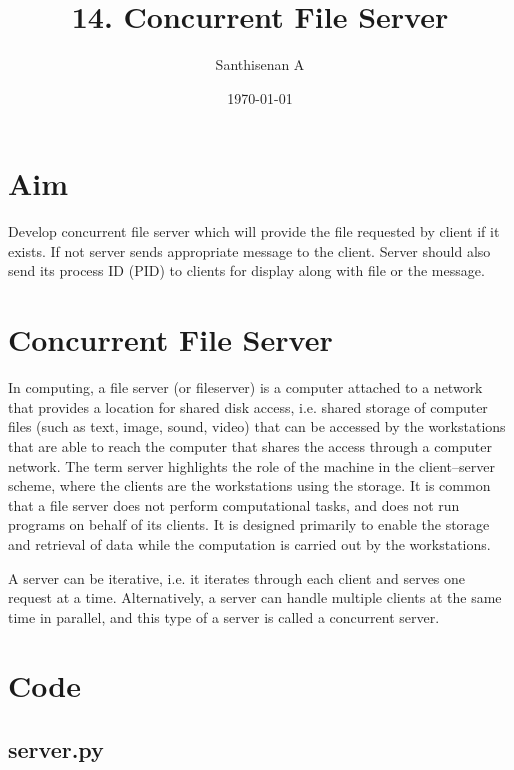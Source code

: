 \documentclass[a4paper,12pt]{article}
\begin{document}
    \title{14. Concurrent File Server}
    \author{Santhisenan A}
    \date{\today}
    \maketitle

\section{Aim}
Develop concurrent file server which will provide the file requested by client if it exists. If not server
sends appropriate message to the client. Server should also send its process ID (PID) to clients for
display along with file or the message.

\section {Concurrent File Server}
In computing, a file server (or fileserver) is a computer attached to a network that provides a location for shared disk access, 
i.e. shared storage of computer files (such as text, image, sound, video) that can be accessed by the workstations 
that are able to reach the computer that shares the access through a computer network. The term server highlights 
the role of the machine in the client–server scheme, where the clients are the workstations using the storage. 
It is common that a file server does not perform computational tasks, and does not run programs on behalf of its 
clients. It is designed primarily to enable the storage and retrieval of data while the computation is carried 
out by the workstations.

A server can be iterative, i.e. it iterates through each client and serves one request at a time.
Alternatively, a server can handle multiple clients at the same time in parallel, and this type of a server is 
called a concurrent server.

\section{Code}
\subsection{server.py}
\end{document}
